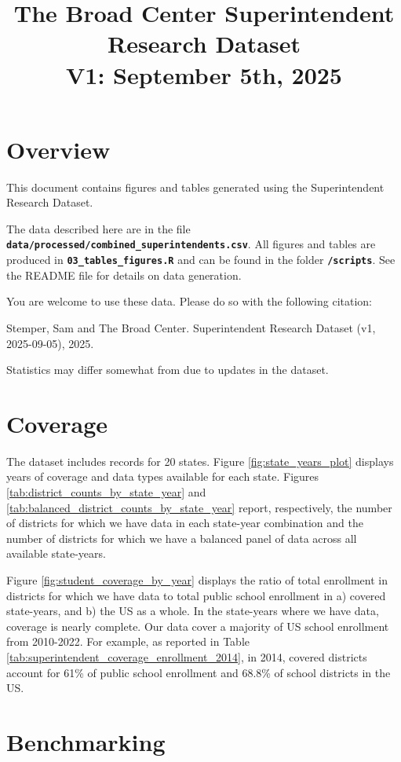 \documentclass[12pt]{article}
\title{The Broad Center Superintendent Research Dataset \\  V1: September 5th, 2025}
\date{}
\begin{document}
\maketitle
\section{Overview}
This document contains figures and tables generated using the Superintendent Research Dataset. 

The data described here are in the file \textbf{\texttt{data/processed/combined\_superintendents.csv}}. All figures and tables are produced in \textbf{\texttt{03\_tables\_figures.R}} and can be found in the folder \textbf{\texttt{/scripts}}. See the README file for details on data generation. 

You are welcome to use these data. Please do so with the following citation: 

\noindent Stemper, Sam and The Broad Center. Superintendent Research Dataset (v1, 2025-09-05), 2025. 

Statistics may differ somewhat from \citet{stemper} due to updates in the dataset. 

\section{Coverage}
The dataset includes records for 20 states. Figure \ref{fig:state_years_plot} displays years of coverage and data types available for each state. Figures \ref{tab:district_counts_by_state_year} and \ref{tab:balanced_district_counts_by_state_year} report, respectively, the number of districts for which we have data in each state-year combination and the number of districts for which we have a balanced panel of data across all available state-years. 

Figure \ref{fig:student_coverage_by_year} displays the ratio of total enrollment in districts for which we have data to total public school enrollment in a) covered state-years, and b) the US as a whole. In the state-years where we have data, coverage is nearly complete. Our data cover a majority of US school enrollment from 2010-2022. For example, as reported in Table \ref{tab:superintendent_coverage_enrollment_2014}, in 2014, covered districts account for 61\% of public school enrollment and 68.8\% of school districts in the US. 

\section{Benchmarking}
\end{document}
